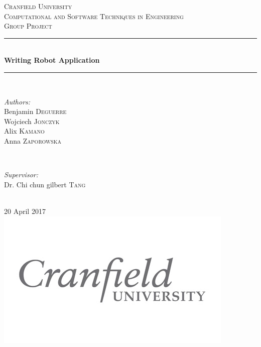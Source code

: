 \documentclass[12pt,a4paper]{article}
\numberwithin{equation}{section}
\begin{document}
	\begin{titlepage}

		\newcommand{\HRule}{\rule{\linewidth}{0.5mm}} %

		\center %

		\textsc{\LARGE Cranfield University}\\[1.5cm] %
		\textsc{\Large Computational and Software Techniques in Engineering}\\[0.5cm] %
		\textsc{\large Group Project}\\[0.5cm] %

		\HRule \\[0.4cm]
		{ \huge \bfseries Writing Robot Application}\\[0.4cm] %
		\HRule \\[1.5cm]

		\begin{minipage}{0.4\textwidth}
			\begin{flushleft} \large
				\emph{Authors:}\\
				Benjamin \textsc{Deguerre}\\
				Wojciech \textsc{Jonczyk}\\ %
				Alix \textsc{Kamano}\\
				Anna \textsc{Zaporowska}
			\end{flushleft}
		\end{minipage}
		~
		\begin{minipage}{0.4\textwidth}
			\begin{flushright} \large
				\emph{Supervisor:} \\
				Dr. Chi chun gilbert \textsc{Tang} %
			\end{flushright}
		\end{minipage}\\[2cm]

		{\large 20 April 2017}\\[1cm] %

		\includegraphics{logo}\\[1cm] %


		\vfill %

	\end{titlepage}

\tableofcontents

\newpage

\newpage

\newpage

\newpage

\newpage

\newpage
\end{document}
